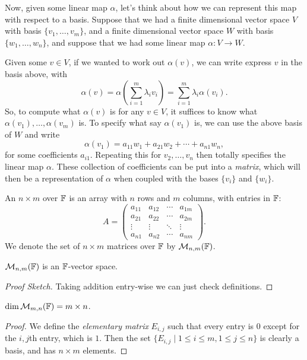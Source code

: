\documentclass[a4paper]{scrartcl}
\begin{document}
Now, given some linear map $\alpha$, let's think about how we can represent this map with respect to a basis.
Suppose that we had a finite dimensional vector space $V$ with basis $\{v_1, \dots, v_m\}$, and a finite dimensional vector space $W$ with basis $\{w_1, \dots, w_n\}$, and suppose that we had some linear map $\alpha : V \rightarrow W$.

Given some $v \in V$, if we wanted to work out $\alpha(v)$, we can write express $v$ in the basis above, with
$$
\alpha(v) = \alpha\left(\sum_{i = 1}^m \lambda_i v_i\right) = \sum_{i = 1}^m \lambda_i \alpha(v_i).
$$
So, to compute what $\alpha(v)$ is for any $v \in V$, it suffices to know what $\alpha(v_1), \dots, \alpha(v_m)$ is. To specify what say $\alpha(v_1)$ is, we can use the above basis of $W$ and write
$$
\alpha(v_1) = a_{11} w_1 + a_{21} w_2 + \cdots + a_{n1} w_n,
$$
for some coefficients $a_{i1}$. Repeating this for $v_2, \dots, v_n$ then totally specifies the linear map $\alpha$.
These collection of coefficients can be put into a \emph{matrix}, which will then be a representation of $\alpha$ when coupled with the bases $\{v_i\}$ and $\{w_i\}$.


\begin{definition}[Matrix]
    An $n \times m$  over $\mathbb{F}$ is an array with $n$ rows and $m$ columns, with entries in $\mathbb{F}$:
    $$
    A = \begin{pmatrix}
        a_{11} & a_{12} & \cdots & a_{1m} \\
        a_{21} & a_{22} & \cdots & a_{2m} \\
        \vdots&\vdots&\ddots &\vdots\\
        a_{n1} & a_{n2} & \cdots & a_{nm}
    \end{pmatrix}.
    $$
    We denote the set of $n \times m$ matrices over $\mathbb{F}$ by $\mathcal{M}_{n,m}(\mathbb{F})$.
\end{definition}

\begin{proposition}
    $\mathcal{M}_{n, m}(\mathbb{F})$ is an $\mathbb{F}$-vector space.
\end{proposition}
\begin{proof}[Proof Sketch]
    Taking addition entry-wise we can just check definitions.
\end{proof}

\begin{proposition}
    $\dim \mathcal{M}_{m, n}(\mathbb{F}) = m \times n$.
\end{proposition}
\begin{proof}
    We define the \emph{elementary matrix} $E_{i, j}$ such that every entry is $0$ except for the $i, j$th entry, which is $1$.
    Then the set $\{E_{i, j} \mid 1 \leq i \leq m, 1 \leq j \leq n\}$ is clearly a basis, and has $n \times m$ elements.
\end{proof}
\end{document}
